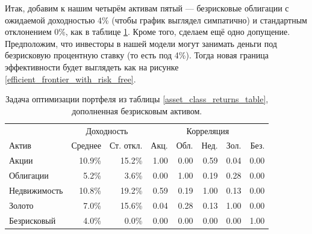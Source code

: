 Итак, добавим к нашим четырём активам пятый --- безрисковые облигации с 
ожидаемой доходностью 4\% (чтобы график выглядел симпатично) и стандартным 
отклонением 0\%, как в таблице \ref{asset_class_returns_table_with_risk_free}. 
Кроме того, сделаем ещё одно допущение. Предположим, что инвесторы в нашей 
модели могут занимать деньги под безрисковую процентную ставку (то есть под
4\%). Тогда новая граница эффективности будет выглядеть как на рисунке 
\ref{efficient_frontier_with_risk_free}.

\begin{table}[ht]
\centering
\begin{tabular}{l|r|r|r|r|r|r|r}
 & \multicolumn{2}{c|}{Доходность} & \multicolumn{5}{c}{Корреляция} \\ 
\cline{2-8}
Актив        & Среднее & Ст. откл. & Акц. & Обл. & Нед. & Зол. & Без. \\ \hline
Акции        & 10.9\%  & 15.2\%    & 1.00 & 0.00 & 0.59 & 0.04 & 0.00 \\
Облигации    & 5.2\%   & 3.6\%     & 0.00 & 1.00 & 0.19 & 0.28 & 0.00 \\
Недвижимость & 10.8\%  & 19.2\%    & 0.59 & 0.19 & 1.00 & 0.13 & 0.00 \\
Золото       & 7.0\%   & 15.6\%    & 0.04 & 0.28 & 0.13 & 1.00 & 0.00 \\
Безрисковый  & 4.0\%   & 0.0\%     & 0.00 & 0.00 & 0.00 & 0.00 & 1.00
\end{tabular}
\caption{Задача оптимизации портфеля из таблицы \ref{asset_class_returns_table}, 
дополненная безрисковым активом.}
\label{asset_class_returns_table_with_risk_free}
\end{table}

